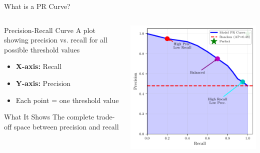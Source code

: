 \documentclass{beamer}
\begin{document}
\begin{frame}{What is a PR Curve?}
\footnotesize
\begin{columns}
\begin{column}{0.48\textwidth}
\begin{definitionbox}{Precision-Recall Curve}
\small
A plot showing precision vs. recall for all possible threshold values

\vspace{0.15cm}

\begin{itemize}
    \item \textbf{X-axis:} Recall
    \item \textbf{Y-axis:} Precision
    \item Each point = one threshold value
\end{itemize}
\end{definitionbox}
\begin{keypointsbox}{What It Shows}
The complete trade-off space between precision and recall
\end{keypointsbox}
\end{column}
\begin{column}{0.48\textwidth}
\includegraphics[width=\textwidth]{pr-curve-diagram.pdf}
\end{column}
\end{columns}
\end{frame}
\end{document}
